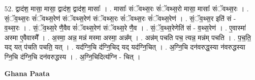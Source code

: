 \documentclass[17pt]{extarticle}
\begin{document}
52. द्वाद॑श॒ मासा॒ मासा॒ द्वाद॑श॒ द्वाद॑श॒ मासाः᳚ । . मासाः᳚ संॅवथ्स॒रः सं॑ॅवथ्स॒रो मासा॒ मासाः᳚ संॅवथ्स॒रः । . सं॒ॅव॒थ्स॒रः सं॑ॅवथ्स॒रेण॑ संॅवथ्स॒रेण॑ संॅवथ्स॒रः सं॑ॅवथ्स॒रः सं॑ॅवथ्स॒रेण॑ । . सं॒ॅव॒थ्स॒र इति॑ सं - व॒थ्स॒रः । . सं॒ॅव॒थ्स॒रे णै॒वैव सं॑ॅवथ्स॒रेण॑ संॅवथ्स॒रे णै॒व । . सं॒ॅव॒थ्स॒रेणेति॑ सं - व॒थ्स॒रेण॑ । . ए॒वास्मा॑ अस्मा ए॒वैवास्मै᳚ । . अ॒स्मा॒ अन्न॒ मन्न॑ मस्मा अस्मा॒ अन्न᳚म् । . अन्न॑म् पचति पच॒ त्यन्न॒ मन्न॑म् पचति । . प॒च॒ति॒ यद् यत् प॑चति पचति॒ यत् । . यद॑ग्नि॒चि द॑ग्नि॒चिद् यद् यद॑ग्नि॒चित् । . अ॒ग्नि॒चि दन॑वरुद्ध॒स्या न॑वरुद्धस्या ग्नि॒चि द॑ग्नि॒चि दन॑वरुद्धस्य । . अ॒ग्नि॒चिदित्य॑ग्नि - चित् । \newline

\textbf{Ghana Paata } \newline
\end{document}
